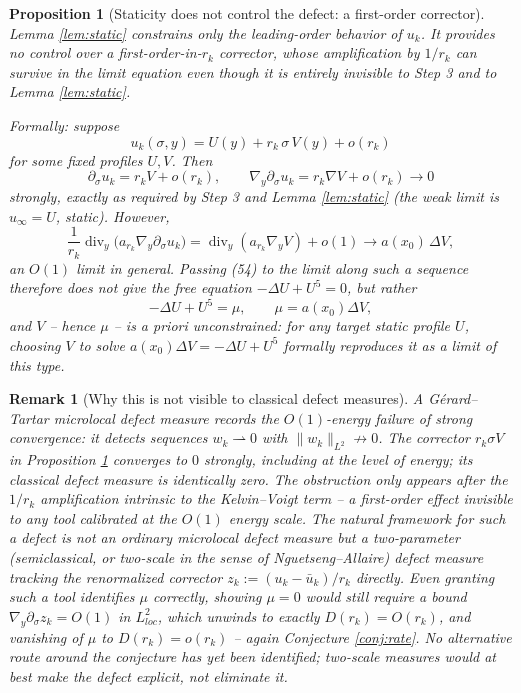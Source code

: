 \documentclass[11pt,letterpaper]{amsart}
\newtheorem{proposition}[theorem]{Proposition}
\newtheorem{remark}[theorem]{Remark}
\begin{document}
\begin{proposition}[Staticity does not control the defect: a first-order
corrector]
\label{prop:corrector}
Lemma \ref{lem:static} constrains only the leading-order behavior of
$u_k$. It provides no control over a first-order-in-$r_k$ corrector,
whose amplification by $1/r_k$ can survive in the limit equation even
though it is entirely invisible to Step 3 and to Lemma \ref{lem:static}.

Formally: suppose
\[
u_k(\sigma,y)=U(y)+r_k\,\sigma\,V(y)+o(r_k)
\]
for some fixed profiles $U,V$. Then
\[
\partial_\sigma u_k=r_kV+o(r_k),\qquad
\nabla_y\partial_\sigma u_k=r_k\nabla V+o(r_k)\longrightarrow0
\]
strongly, exactly as required by Step 3 and Lemma \ref{lem:static} (the
weak limit is $u_\infty=U$, static). However,
\[
\frac1{r_k}\operatorname{div}_y\big(a_{r_k}\nabla_y\partial_\sigma u_k\big)
=\operatorname{div}_y(a_{r_k}\nabla_yV)+o(1)
\longrightarrow a(x_0)\,\Delta V,
\]
an $O(1)$ limit in general. Passing (54) to the limit along such a
sequence therefore does not give the free equation
$-\Delta U+U^5=0$, but rather
\[
-\Delta U+U^5=\mu,\qquad \mu=a(x_0)\Delta V,
\]
and $V$ -- hence $\mu$ -- is a priori unconstrained: for any target
static profile $U$, choosing $V$ to solve $a(x_0)\Delta V=-\Delta
U+U^5$ formally reproduces it as a limit of this type.
\end{proposition}

\begin{remark}[Why this is not visible to classical defect measures]
\label{rem:blind}
A Gérard--Tartar microlocal defect measure records the $O(1)$-energy
failure of strong convergence: it detects sequences $w_k\rightharpoonup0$
with $\|w_k\|_{L^2}\not\to0$. The corrector $r_k\sigma V$ in Proposition
\ref{prop:corrector} converges to $0$ \emph{strongly}, including at the
level of energy; its classical defect measure is identically zero. The
obstruction only appears after the $1/r_k$ amplification intrinsic to
the Kelvin--Voigt term -- a first-order effect invisible to any tool
calibrated at the $O(1)$ energy scale. The natural framework for such a
defect is not an ordinary microlocal defect measure but a two-parameter
(semiclassical, or two-scale in the sense of Nguetseng--Allaire) defect
measure tracking the renormalized corrector $z_k:=(u_k-\bar u_k)/r_k$
directly. Even granting such a tool identifies $\mu$ correctly, showing
$\mu=0$ would still require a bound $\nabla_y\partial_\sigma z_k=
O(1)$ in $L^2_{loc}$, which unwinds to exactly $D(r_k)=O(r_k)$, and
vanishing of $\mu$ to $D(r_k)=o(r_k)$ -- again Conjecture \ref{conj:rate}. No
alternative route around the conjecture has yet been identified; two-scale
measures would at best make the defect explicit, not eliminate it.
\end{remark}
\end{document}
